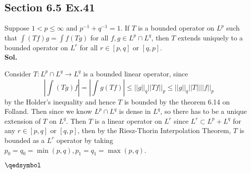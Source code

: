 \documentclass[lang=en,11pt,a4paper,citestyle =authoryear]{elegantpaper}
\newcommand{\prvd}{$\hfill \qedsymbol$}
\begin{document}
\subsection*{Section 6.5 Ex.41} 
Suppose $1<p\leq \infty$ and $p^{-1}+q^{-1} = 1$. If $T$ is a bounded operator on $L^p$ such that $\int(Tf)g = \int f(Tg)$ for all $f,g\in L^p\cap L^q$, then $T$ extends uniquely to a bounded operator on $L^r$ for all $r\in [p,q]$ or $[q,p]$.
\vspace{0.5em}\\
\textbf{Sol.} \par
Consider $T:L^p\cap L^q \to L^q$ is a bounded linear operator, since
\[
|\int(Tg)f| = |\int g(Tf)| \leq ||g||_q ||Tf||_p \leq ||g||_q||T||||f||_p
\]
by the Holder's inequality and hence $T$ is bounded by the theorem 6.14 on Folland. Then since we know $L^p\cap L^q$ is dense in $L^q$, so there has to be a unique extension of $T$ on $L^q$. Then $T$ is a linear operator on $L^r$ since $L^r \subset L^p+L^q$ for any $r\in [p,q]$ or $[q,p]$, then by the Riesz-Thorin Interpolation Theorem, $T$ is bounded as a $L^r$ operator by taking $p_0 = q_0 = \min(p,q), p_1 = q_1 = \max(p,q)$.
\par
\prvd
\vspace{0.5em}

\addappheadtotoc
\end{document}

